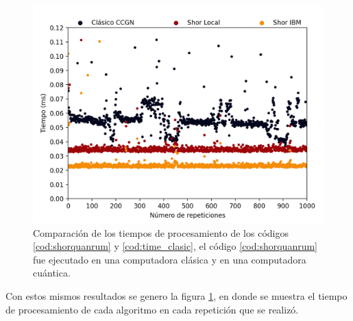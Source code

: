 \begin{figure}[H]
    \centering
    \includegraphics[scale=0.7]{images/time.png}
    \caption{Comparación de los tiempos de procesamiento de los códigos \ref{cod:shorquanrum} y \ref{cod:time_clasic}, el código \ref{cod:shorquanrum} fue 
    ejecutado en una computadora clásica y en una computadora cuántica.}
    \label{fig:time}
\end{figure}
Con estos mismos resultados se genero la figura \ref{fig:time}, en donde se muestra el tiempo de procesamiento de cada algoritmo en cada repetición que se realizó.